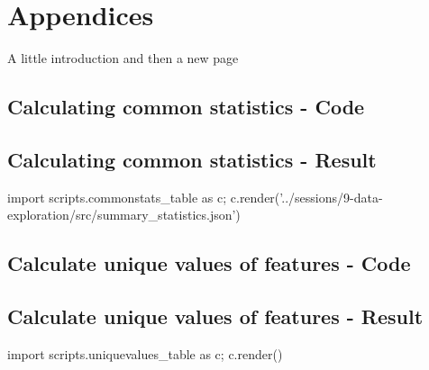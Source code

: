 \chapter{Appendices}
A little introduction and then a new page
\pagebreak

\section{Calculating common statistics - Code}\label{app:source-common-statistics}



\pagebreak

\section{Calculating common statistics - Result}\label{app:result-common-statistics}
{\small\sffamily
\begin{python}
    import scripts.commonstats_table as c; c.render('../sessions/9-data-exploration/src/summary_statistics.json')
\end{python}
}

\clearpage

\section{Calculate unique values of features - Code} %
\label{app:source-unique-values}




\clearpage

\section{Calculate unique values of features - Result} %
\label{app:result-unique-values}
{\small\sffamily
\begin{python}
    import scripts.uniquevalues_table as c; c.render()
\end{python}
}

